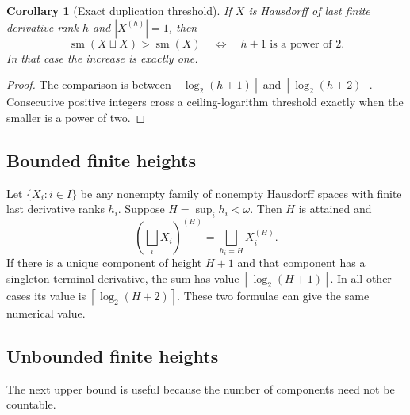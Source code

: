 \documentclass[11pt,letterpaper]{article}
\numberwithin{equation}{section}
\newtheorem{corollary}[corollary]{Corollary}
\theoremstyle{definition}
\theoremstyle{remark}
\newcommand{\sm}{\operatorname{sm}}
\newcommand{\ceil}[1]{\left\lceil#1\right\rceil}
\newcommand{\bigsqsum}{\bigsqcup}
\begin{document}
\begin{corollary}[Exact duplication threshold]\label{cor:threshold}
If $X$ is Hausdorff of last finite derivative rank $h$ and
$|X^{(h)}|=1$, then
\[
 \sm(X\sqcup X)>
 \sm(X)
 \quad\Longleftrightarrow\quad h+1\text{ is a power of }2.
\]
In that case the increase is exactly one.
\end{corollary}
\begin{proof}
The comparison is between $\ceil{\log_2(h+1)}$ and
$\ceil{\log_2(h+2)}$. Consecutive positive integers cross a ceiling-logarithm
threshold exactly when the smaller is a power of two.
\end{proof}

\subsection{Bounded finite heights}

Let $\{X_i:i\in I\}$ be any nonempty family of nonempty Hausdorff spaces with
finite last derivative ranks $h_i$. Suppose $H=\sup_i h_i<\omega$. Then $H$
is attained and
\[
 \left(\bigsqsum_iX_i\right)^{(H)}
 =\bigsqsum_{h_i=H}X_i^{(H)}.
\]
If there is a unique component of height $H+1$ and that component has a
singleton terminal derivative, the sum has value $\ceil{\log_2(H+1)}$.
In all other cases its value is $\ceil{\log_2(H+2)}$.
These two formulae can give the same numerical value.

\subsection{Unbounded finite heights}

The next upper bound is useful because the number of components need not be
countable.
\end{document}
